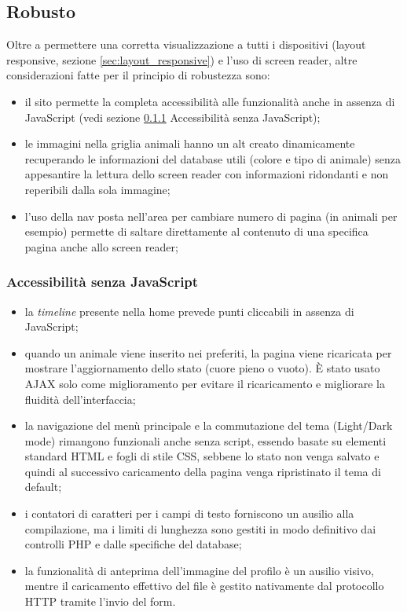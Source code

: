 \subsection{Robusto}
Oltre a permettere una corretta visualizzazione a tutti i dispositivi (layout responsive, sezione \ref{sec:layout_responsive}) e l'uso di screen reader, altre considerazioni fatte per il principio di robustezza sono:
\begin{itemize}
    \item il sito permette la completa accessibilità alle funzionalità anche in assenza di JavaScript (vedi sezione \ref{sec:javascript_accessibilita}{ Accessibilità senza JavaScript});
    \item le immagini nella griglia animali hanno un alt creato dinamicamente recuperando le informazioni del database utili (colore e tipo di animale) senza appesantire la lettura dello screen reader con informazioni ridondanti e non reperibili dalla sola immagine;
    \item l'uso della nav posta nell'area per cambiare numero di pagina (in animali per esempio) permette di saltare direttamente al contenuto di una specifica pagina anche allo screen reader;
\end{itemize}
\subsubsection{Accessibilità senza JavaScript}
\label{sec:javascript_accessibilita}
\begin{itemize} 
    \item la \textit{timeline} presente nella home prevede punti cliccabili in assenza di JavaScript; 
    \item quando un animale viene inserito nei preferiti, la pagina viene ricaricata per mostrare l'aggiornamento dello stato (cuore pieno o vuoto). È stato usato AJAX solo come miglioramento per evitare il ricaricamento e migliorare la fluidità dell'interfaccia; 
    \item la navigazione del menù principale e la commutazione del tema (Light/Dark mode) rimangono funzionali anche senza script, essendo basate su elementi standard HTML e fogli di stile CSS, sebbene lo stato non venga salvato e quindi al successivo caricamento della pagina venga ripristinato il tema di default;
    \item i contatori di caratteri per i campi di testo forniscono un ausilio alla compilazione, ma i limiti di lunghezza sono gestiti in modo definitivo dai controlli PHP e dalle specifiche del database;
    \item la funzionalità di anteprima dell'immagine del profilo è un ausilio visivo, mentre il caricamento effettivo del file è gestito nativamente dal protocollo HTTP tramite l'invio del form.
\end{itemize}